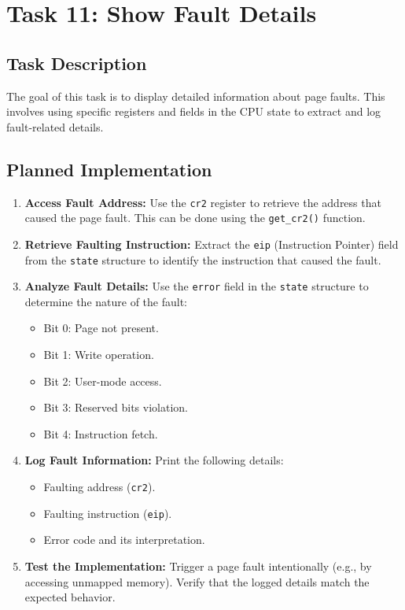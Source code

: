 \documentclass[a4paper,12pt]{report}
\begin{document}
\chapter{Task 11: Show Fault Details}

\section{Task Description}
The goal of this task is to display detailed information about page faults. This involves using specific registers and fields in the CPU state to extract and log fault-related details.

\section{Planned Implementation}
\begin{enumerate}
    \item \textbf{Access Fault Address:}
    Use the \texttt{cr2} register to retrieve the address that caused the page fault. This can be done using the \texttt{get\_cr2()} function.
    \item \textbf{Retrieve Faulting Instruction:}
    Extract the \texttt{eip} (Instruction Pointer) field from the \texttt{state} structure to identify the instruction that caused the fault.
    \item \textbf{Analyze Fault Details:}
    Use the \texttt{error} field in the \texttt{state} structure to determine the nature of the fault:
    \begin{itemize}
        \item Bit 0: Page not present.
        \item Bit 1: Write operation.
        \item Bit 2: User-mode access.
        \item Bit 3: Reserved bits violation.
        \item Bit 4: Instruction fetch.
    \end{itemize}
    \item \textbf{Log Fault Information:}
    Print the following details:
    \begin{itemize}
        \item Faulting address (\texttt{cr2}).
        \item Faulting instruction (\texttt{eip}).
        \item Error code and its interpretation.
    \end{itemize}
    \item \textbf{Test the Implementation:}
    Trigger a page fault intentionally (e.g., by accessing unmapped memory). Verify that the logged details match the expected behavior.
\end{enumerate}
\end{document}
